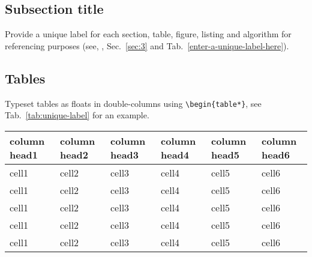 \documentclass[british]{emisa}
\begin{document}
\begin{article}
\subsection{Subsection title}\label{sec:2}
Provide a unique label for each section, table, figure, listing and algorithm for referencing purposes (see, \eg, Sec.~\ref{sec:3} and Tab.~\ref{enter-a-unique-label-here}). 




%
%
%


\subsection{Tables}\label{sec:tables}
Typeset tables as floats in double-columns using \verb|\begin{table*}|, see Tab.~\ref{tab:unique-label} for an example.

\begin{table*}[tb]
\centering
\caption{Enter your table caption above the table here.}
\begin{tabular}{llllll}
\toprule
column head1 & column head2 & column head3 & column head4 & column head5 & column head6\\
\midrule
cell1 & cell2 & cell3 & cell4 & cell5 & cell6\\
cell1 & cell2 & cell3 & cell4 & cell5 & cell6\\
cell1 & cell2 & cell3 & cell4 & cell5 & cell6\\
cell1 & cell2 & cell3 & cell4 & cell5 & cell6\\
cell1 & cell2 & cell3 & cell4 & cell5 & cell6\\
\bottomrule
\end{tabular}
\label{tab:unique-label}
\end{table*}




\end{article}
\end{document}
